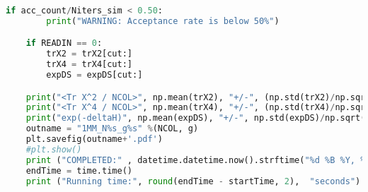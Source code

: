 \begin{footnotesize}
\begin{lstlisting}[language=Python]
    if acc_count/Niters_sim < 0.50:
        print("WARNING: Acceptance rate is below 50%")

    if READIN == 0:
        trX2 = trX2[cut:]
        trX4 = trX4[cut:]
        expDS = expDS[cut:] 

    print("<Tr X^2 / NCOL>", np.mean(trX2), "+/-", (np.std(trX2)/np.sqrt(np.size(trX2) - 1.0)))
    print("<Tr X^4 / NCOL>", np.mean(trX4), "+/-", (np.std(trX4)/np.sqrt(np.size(trX4) - 1.0)))
    print("exp(-deltaH)", np.mean(expDS), "+/-", np.std(expDS)/np.sqrt(np.size(expDS) - 1.0))
    outname = "1MM_N%s_g%s" %(NCOL, g)
    plt.savefig(outname+'.pdf')
    #plt.show()
    print ("COMPLETED:" , datetime.datetime.now().strftime("%d %B %Y, %H:%M:%S"))
    endTime = time.time() 
    print ("Running time:", round(endTime - startTime, 2),  "seconds")
\end{lstlisting}
\end{footnotesize} 